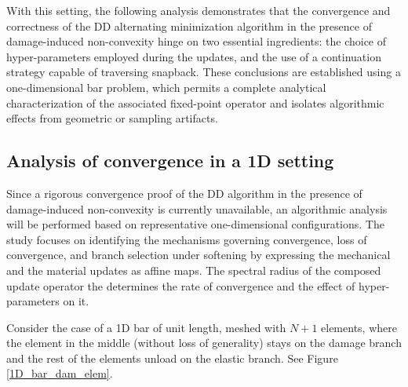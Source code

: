 \documentclass[10pt]{cas-sc}
\newenvironment{deletedblock}
{\begin{tcbstrikeout}\color{red}}
	{\end{tcbstrikeout}}
\begin{document}
\begin{deletedblock}
	With this setting, the following analysis demonstrates that the convergence and correctness of the DD alternating minimization algorithm in the presence of damage-induced non-convexity hinge on two essential ingredients: the choice of hyper-parameters employed during the updates, and the use of a continuation strategy capable of traversing snapback. These conclusions are established using a one-dimensional bar problem, which permits a complete analytical characterization of the associated fixed-point operator and isolates algorithmic effects from geometric or sampling artifacts.
\end{deletedblock}


\subsection{Analysis of convergence in a 1D setting \label{conv_method_rate}}

\begin{deletedblock}
Since a rigorous convergence proof of the DD algorithm in the presence of damage-induced non-convexity is currently unavailable, an algorithmic analysis will be performed based on representative one-dimensional configurations. The study focuses on identifying the mechanisms governing convergence, loss of convergence, and branch selection under softening by expressing the mechanical and the material updates as affine maps. The spectral radius of the composed update operator the determines the rate of convergence and the effect of hyper-parameters on it.  
\end{deletedblock}

Consider the case of a 1D bar of unit length, meshed with $N+1$ elements, where the element in the middle (without loss of generality) stays on the damage branch and the rest of the elements unload on the elastic branch. See Figure \ref{1D_bar_dam_elem}. 
\end{document}
